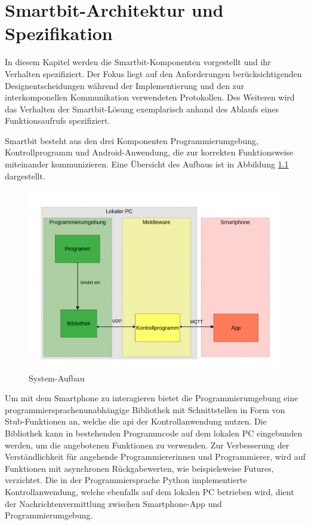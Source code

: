 \documentclass[11pt,a4paper]{report}
\begin{document}
\chapter{Smartbit-Architektur und Spezifikation} \label{chap:architektur}
In diesem Kapitel werden die Smartbit-Komponenten vorgestellt und ihr Verhalten spezifiziert.
Der Fokus liegt auf den Anforderungen berücksichtigenden Designentscheidungen während der Implementierung und den zur interkomponellen Kommunikation verwendeten Protokollen.
Des Weiteren wird das Verhalten der Smartbit-Lösung exemplarisch anhand des Ablaufs eines Funktionsaufrufs spezifiziert.

Smartbit besteht aus den drei Komponenten Programmierumgebung, Kontrollprogramm und Android-Anwendung, die zur korrekten Funktionsweise miteinander kommunizieren.
Eine Übersicht des Aufbaus ist in Abbildung \ref{fig:design} dargestellt.
\begin{figure}[htbp]
\centering
\includegraphics[width=\textwidth]{images/framework.pdf}
\caption{System-Aufbau}
\label{fig:design}
\end{figure}
Um mit dem Smartphone zu interagieren bietet die Programmierumgebung eine programmiersprachenunabhängige Bibliothek mit Schnittstellen in Form von Stub-Funktionen an, welche die \acrfull{api} der Kontrollanwendung nutzen.
Die Bibliothek kann in bestehenden Programmcode auf dem lokalen PC eingebunden werden, um die angebotenen Funktionen zu verwenden.
Zur Verbesserung der Verständlichkeit für angehende Programmiererinnen und Programmierer, wird auf Funktionen mit asynchronen Rückgabewerten, wie beispielsweise Futures, verzichtet.
Die in der Programmiersprache Python implementierte Kontrollanwendung, welche ebenfalls auf dem lokalen PC betrieben wird, dient der Nachrichtenvermittlung zwischen Smartphone-App und Programmierumgebung.
\end{document}
